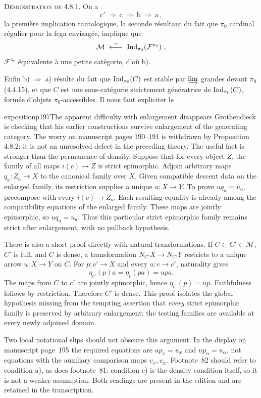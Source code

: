 \textsc{Démonstration de 4.8.1.} On a
\[
\mathrm{c}' \ \Longrightarrow \ \mathrm{c} \ \Longrightarrow \ \mathrm{b} \ \Longrightarrow \ \mathrm{a} \, ,
\]
la première implication tautologique, la seconde résultant du fait que $\pi_0$ cardinal régulier pour la fcga envisagée, implique que
\[
\mathcal{M} \ \xleftarrow{\ \sim\ } \ \Ind_{\pi_0}(\mathcal{F}^{\pi_0}) \ ,
\]
$\mathcal{F}^{\pi_0}$ équivalente à une petite catégorie, d'où b).

Enfin b) $\Longrightarrow$ a) résulte du fait que $\operatorname{Ind}_{\pi_0}(C)$ est stable par $\varinjlim$ grandes devant $\pi_0$ (4.4.15), et que $C$ est une sous-catégorie strictement génératrice de $\operatorname{Ind}_{\pi_0}(C)$, formée d'objets $\pi_0$-accessibles. Il nous faut expliciter le

\begin{dcomment}{exposition}{p197}{The apparent difficulty with enlargement disappears}
Grothendieck is checking that his earlier constructions survive enlargement of the generating category. The worry on manuscript pages 190--191 is withdrawn by Proposition 4.8.2; it is not an unresolved defect in the preceding theory. The useful fact is stronger than the permanence of density. Suppose that for every object $Z$, the family of all maps $i(c)\to Z$ is strict epimorphic. Adjoin arbitrary maps $q_a:Z_a\to X$ to the canonical family over $X$. Given compatible descent data on the enlarged family, its restriction supplies a unique $u:X\to Y$. To prove $uq_a=u_a$, precompose with every $i(c)\to Z_a$. Each resulting equality is already among the compatibility equations of the enlarged family. These maps are jointly epimorphic, so $uq_a=u_a$. Thus this particular strict epimorphic family remains strict after enlargement, with no pullback hypothesis.

There is also a short proof directly with natural transformations. If $C\subset C'\subset\mathcal M$, $C'$ is full, and $C$ is dense, a transformation $N_{C'}X\to N_{C'}Y$ restricts to a unique arrow $u:X\to Y$ on $C$. For $p:c'\to X$ and every $a:c\to c'$, naturality gives
\[
 \eta_{c'}(p)a=\eta_c(pa)=upa.
\]
The maps from $C$ to $c'$ are jointly epimorphic, hence $\eta_{c'}(p)=up$. Faithfulness follows by restriction. Therefore $C'$ is dense. This proof isolates the global hypothesis missing from the tempting assertion that \emph{every} strict epimorphic family is preserved by arbitrary enlargement: the testing families are available at every newly adjoined domain.

Two local notational slips should not obscure this argument. In the display on manuscript page~195 the required equations are $up_x=u_x$ and $up_\alpha=u_\alpha$, not equations with the auxiliary comparison maps $v_x,v_\alpha$. Footnote~82 should refer to condition a), as does footnote~81: condition c) is the density condition itself, so it is not a weaker assumption. Both readings are present in the edition and are retained in the transcription.
\end{dcomment}


